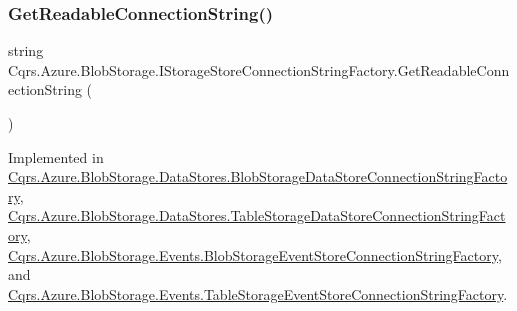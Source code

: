 \subsubsection{\texorpdfstring{Get\+Readable\+Connection\+String()}{GetReadableConnectionString()}}
{\footnotesize\ttfamily string Cqrs.\+Azure.\+Blob\+Storage.\+I\+Storage\+Store\+Connection\+String\+Factory.\+Get\+Readable\+Connection\+String (\begin{DoxyParamCaption}{ }\end{DoxyParamCaption})}



Implemented in \hyperlink{classCqrs_1_1Azure_1_1BlobStorage_1_1DataStores_1_1BlobStorageDataStoreConnectionStringFactory_a1b5b69109d07e5612df981012d812e78_a1b5b69109d07e5612df981012d812e78}{Cqrs.\+Azure.\+Blob\+Storage.\+Data\+Stores.\+Blob\+Storage\+Data\+Store\+Connection\+String\+Factory}, \hyperlink{classCqrs_1_1Azure_1_1BlobStorage_1_1DataStores_1_1TableStorageDataStoreConnectionStringFactory_a0bdcd6f6d273a225c3ebcd6aa9386b95_a0bdcd6f6d273a225c3ebcd6aa9386b95}{Cqrs.\+Azure.\+Blob\+Storage.\+Data\+Stores.\+Table\+Storage\+Data\+Store\+Connection\+String\+Factory}, \hyperlink{classCqrs_1_1Azure_1_1BlobStorage_1_1Events_1_1BlobStorageEventStoreConnectionStringFactory_aa47606e4cd5a71437bed71e07fda53ed_aa47606e4cd5a71437bed71e07fda53ed}{Cqrs.\+Azure.\+Blob\+Storage.\+Events.\+Blob\+Storage\+Event\+Store\+Connection\+String\+Factory}, and \hyperlink{classCqrs_1_1Azure_1_1BlobStorage_1_1Events_1_1TableStorageEventStoreConnectionStringFactory_a047e58aa30e97231dc913df350bc2446_a047e58aa30e97231dc913df350bc2446}{Cqrs.\+Azure.\+Blob\+Storage.\+Events.\+Table\+Storage\+Event\+Store\+Connection\+String\+Factory}.

\mbox{\label{interfaceCqrs_1_1Azure_1_1BlobStorage_1_1IStorageStoreConnectionStringFactory_a26ecfd0805fe3d525e9fa419330bd140_a26ecfd0805fe3d525e9fa419330bd140}} 
